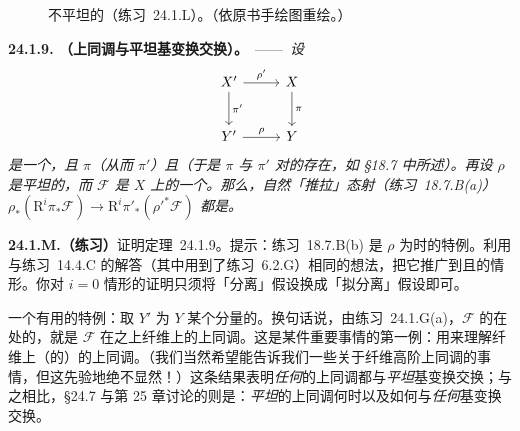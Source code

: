 \begin{figure}[htbp]
\centering
{}
\caption{不平坦的\trMorphism{}（\mbox{练习~24.1.L}）。（依原书手绘图重绘。）}\label{fig:not-flat-morphisms}
\end{figure}

\textbf{24.1.9. \trhTheorem{}（上同调与平坦基变换交换）。}\ ——\ \emph{设}
\[
\begin{tikzcd}[row sep=2.4em, column sep=2.6em]
X' \ar[r, "\rho'"] \ar[d, "\pi'"] & X \ar[d, "\pi"] \\
Y' \ar[r, "\rho"] & Y
\end{tikzcd}
\]
\emph{是一个\trCartesianDiagram，且 $\pi$（从而 $\pi'$）\trQuasicompact{}且\trSeparated（于是 $\pi$ 与 $\pi'$ 对\trQCSheaf{}的\trHigherPushforward{}存在，如 \S18.7 中所述）。再设 $\rho$ 是平坦的，而 $\mathscr{F}$ 是 $X$ 上的一个\trQCSheaf。那么，自然「推拉」态射（\mbox{练习~18.7.B}(a)）$\rho_{*}(\mathrm{R}^{i}\pi_\ast\mathscr{F})\to\mathrm{R}^{i}\pi'_\ast(\rho'^{*}\mathscr{F})$ 都是\trIsomorphism。}

\textbf{24.1.M.（练习）}\quad 证明\mbox{定理~24.1.9}。提示：\mbox{练习~18.7.B}(b) 是 $\rho$ 为\trAffine{}时的特例。利用与\mbox{练习~14.4.C} 的解答（其中用到了\mbox{练习~6.2.G}）相同的想法，把它推广到\trQuasicompact{}且\trSeparated{}的情形。你对 $i=0$ 情形的证明只须将「分离」假设换成「拟分离」假设即可。

一个有用的特例：取 $Y'$ 为 $Y$ 某个\trReduced{}分量的\trGenericPoint。换句话说，由\mbox{练习~24.1.G}(a)，$\mathscr{F}$ 的\trHigherPushforward{}在\trGenericPoint{}处的\trStalk，就是 $\mathscr{F}$ 在\trGenericPoint{}之上纤维上的上同调。这是某件重要事情的第一例：用\trHigherPushforward{}来理解纤维上（的\trQCSheaf）的上同调。（我们当然希望\trHigherPushforward{}能告诉我们一些关于纤维高阶上同调的事情，但这先验地绝不显然！）这条结果表明\emph{任何}\trQCSheaf{}的上同调都与\emph{平坦}基变换交换；与之相比，\S24.7 与第 25 章讨论的则是：\emph{平坦}\trQCSheaf{}的上同调何时以及如何与\emph{任何}基变换交换。

